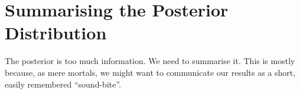 \section{Summarising the Posterior Distribution}
The posterior is too much information. We need to summarise it. This is mostly
because, as mere mortals, we might want to communicate our results as a short,
easily remembered ``sound-bite''.
